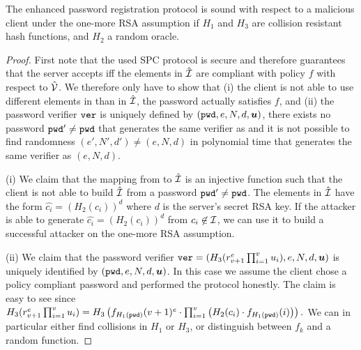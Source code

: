 \begin{lemma}[Soundness]\label{lem:soundness}
 The enhanced password registration protocol is sound with respect to a malicious client under the one-more RSA assumption if $H_1$ and $H_3$ are collision resistant hash functions, and $H_2$ a random oracle.
\end{lemma}

\begin{proof}
  First note that the used \ac{SPC} protocol is secure and therefore guarantees that the server accepts iff the elements in $\hat{\mathcal{I}}$ are compliant with policy $f$ with respect to $\hat{\mathcal{V}}$.
  We therefore only have to show that (i) the client is not able to use different elements in \ClientSet than in $\hat{\mathcal{I}}$, \ie the password \pwd actually satisfies $f$, and (ii) the password verifier $\mathtt{ver}$ is uniquely defined by $(\mathtt{pwd}, e, N, d, \bm{u})$, \ie there exists no password $\mathtt{pwd}'\not=\mathtt{pwd}$ that generates the same verifier as \pwd and it is not possible to find randomness $(e',N', d')\not=(e, N, d)$ in polynomial time that generates the same verifier as $(e,N, d)$.
  
  (i) We claim that the mapping from \ClientSet to $\hat{\mathcal{I}}$ is an injective function such that the client is not able to build $\hat{\mathcal{I}}$ from a password $\mathtt{pwd}'\not=\mathtt{pwd}$.
  The elements in $\hat{\mathcal{I}}$ have the form $\hat{c_i}=(H_2(c_i))^d$ where $d$ is the server's secret RSA key.
  If the attacker is able to generate $\hat{c_i}=(H_2(c_i))^d$ from $c_i\not\in\mathcal{I}$, we can use it to build a successful attacker on the one-more RSA assumption.
  
  (ii) We claim that the password verifier $\mathtt{ver}=(H_3(r_{v+1}^e\prod_{i=1}^{v} u_i), e, N, d, \bm{u})$ is uniquely identified by $(\mathtt{pwd}, e, N, d, \bm{u})$.
  In this case we assume the client chose a policy compliant password \pwd and performed the protocol honestly.
  The claim is easy to see since 
  $
    H_3(r_{v+1}^e\prod_{i=1}^{v} u_i) = 
    H_3\left(f_{H_1(\mathtt{pwd})}(v+1)^e \cdot \prod_{i=1}^{v} \left(H_2(c_i)\cdot f_{H_1(\mathtt{pwd})}(i)\right)\right).
  $
  We can in particular either find collisions in $H_1$ or $H_3$, or distinguish between $f_k$ and a random function.
\end{proof}

